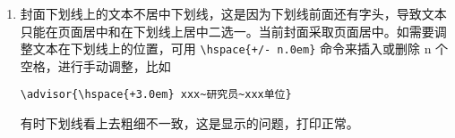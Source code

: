 \begin{enumerate}
    \item 封面下划线上的文本不居中下划线，这是因为下划线前面还有字头，导致文本只能在页面居中和在下划线上居中二选一。当前封面采取页面居中。如需要调整文本在下划线上的位置，可用 \verb|\hspace{+/- n.0em}| 命令来插入或删除 n 个空格，进行手动调整，比如

        \verb|\advisor{\hspace{+3.0em} xxx~研究员~xxx单位}|
                
    有时下划线看上去粗细不一致，这是显示的问题，打印正常。
\end{enumerate}


